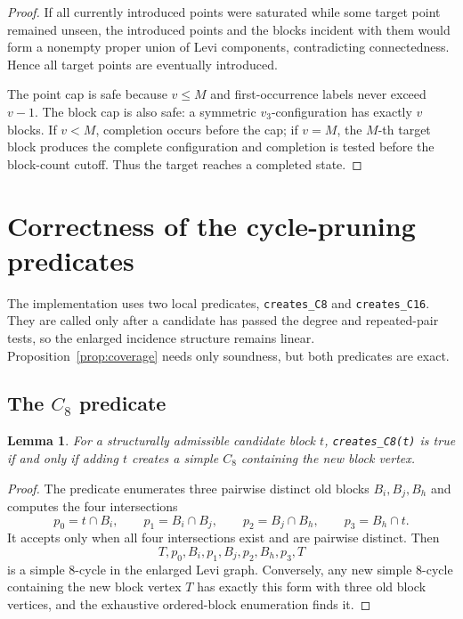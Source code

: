 \documentclass[11pt]{article}
\newtheorem{lemma}[theorem]{Lemma}
\theoremstyle{remark}
\newcommand{\Ceight}{C_8}
\newcommand{\vthree}{v_3}
\begin{document}
\begin{proof}
If all currently introduced points were saturated while some target point remained unseen, the introduced points and the blocks incident with them would form a nonempty proper union of Levi components, contradicting connectedness.  Hence all target points are eventually introduced.

The point cap is safe because \(v\le M\) and first-occurrence labels never exceed \(v-1\).  The block cap is also safe: a symmetric \(\vthree\)-configuration has exactly \(v\) blocks.  If \(v<M\), completion occurs before the cap; if \(v=M\), the \(M\)-th target block produces the complete configuration and completion is tested before the block-count cutoff.  Thus the target reaches a completed state.
\end{proof}

\section{Correctness of the cycle-pruning predicates}\label{sec:oracles}

The implementation uses two local predicates, \texttt{creates\_C8} and \texttt{creates\_C16}.  They are called only after a candidate has passed the degree and repeated-pair tests, so the enlarged incidence structure remains linear.  Proposition~\ref{prop:coverage} needs only soundness, but both predicates are exact.

\subsection{The \texorpdfstring{\(C_8\)}{C8} predicate}

\begin{lemma}\label{lem:c8}
For a structurally admissible candidate block \(t\), \texttt{creates\_C8(t)} is true if and only if adding \(t\) creates a simple \(\Ceight\) containing the new block vertex.
\end{lemma}

\begin{proof}
The predicate enumerates three pairwise distinct old blocks \(B_i,B_j,B_h\) and computes the four intersections
\[
p_0=t\cap B_i,\qquad p_1=B_i\cap B_j,\qquad p_2=B_j\cap B_h,\qquad p_3=B_h\cap t.
\]
It accepts only when all four intersections exist and are pairwise distinct.  Then
\[
T,p_0,B_i,p_1,B_j,p_2,B_h,p_3,T
\]
is a simple 8-cycle in the enlarged Levi graph.  Conversely, any new simple 8-cycle containing the new block vertex \(T\) has exactly this form with three old block vertices, and the exhaustive ordered-block enumeration finds it.
\end{proof}
\end{document}
